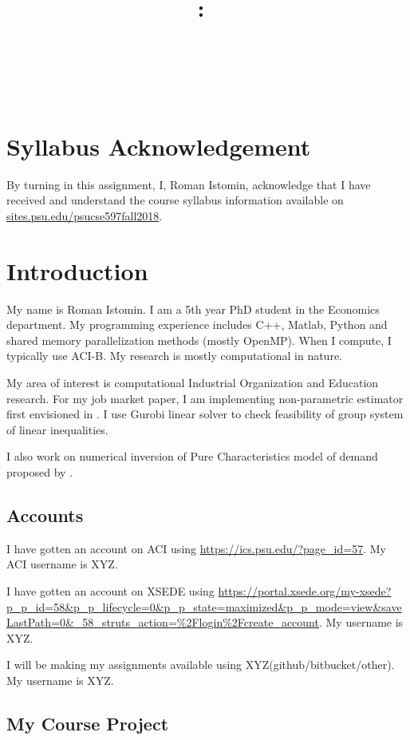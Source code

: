 \documentclass{article}
\title{\vspace{2in}\textmd{\textbf{\hmwkClass:\ \hmwkTitle}}\\\normalsize\vspace{0.1in}\small{\hmwkDueDate}\\\vspace{0.1in}\large{\textit{\hmwkClassInstructor\ \hmwkClassTime}}\vspace{3in}}
\date{}
\author{\textbf{\hmwkAuthorNameb} } %
\newcommand{\hmwkAuthorNameb}{Roman Istomin}
\begin{document}
\begin{spacing}{1.1}
\maketitle

\newpage
\section{Syllabus Acknowledgement}

By turning in this assignment, I, \hmwkAuthorNameb, acknowledge that I have received and understand the course syllabus information available on \url{sites.psu.edu/psucse597fall2018}. 

\section{Introduction}

My name is \hmwkAuthorNameb.  I am a 5th year PhD student in the Economics department. My programming experience includes C++, Matlab, Python and shared memory parallelization methods (mostly OpenMP).  When I compute, I typically use ACI-B.  My research is mostly computational in nature. 

My area of interest is computational Industrial Organization and Education research. For my job market paper, I am implementing non-parametric estimator first envisioned in \cite{agarwal2018demand}. I use Gurobi linear solver to check feasibility of group system of linear inequalities. 

I also work on numerical inversion of Pure Characteristics model of demand proposed by \cite{berry2007pure}. 


\subsection{Accounts}

I have gotten an account on ACI using \url{https://ics.psu.edu/?page_id=57}.  My ACI username is XYZ.

I have gotten an account on XSEDE using \url{https://portal.xsede.org/my-xsede?p_p_id=58&p_p_lifecycle=0&p_p_state=maximized&p_p_mode=view&saveLastPath=0&_58_struts_action=%2Flogin%2Fcreate_account}.  My username is XYZ.

I will be making my assignments available using XYZ(github/bitbucket/other). My username is XYZ. 

\subsection{My Course Project}


\end{spacing}
\end{document}
